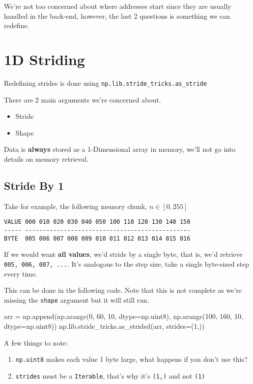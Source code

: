 \documentclass[oneside, 12pt]{report}
\begin{document}
We're not too concerned about where addresses start since they are usually handled in the back-end, however, the last 2 questions is something we can redefine.

\section{1D Striding}

Redefining strides is done using \verb+np.lib.stride_tricks.as_stride+

There are 2 main arguments we're concerned about.

\begin{itemize}
\item{Stride}
\item{Shape}
\end{itemize}

Data is \textbf{always} stored as a 1-Dimensional array in memory, we'll not go into details on memory retrieval.

\subsection{Stride By 1}

Take for example, the following memory chunk, $n \in [0, 255]$

\begin{verbatim}
VALUE 000 010 020 030 040 050 100 110 120 130 140 150
----- ----------------------------------------------- 
BYTE  005 006 007 008 009 010 011 012 013 014 015 016
\end{verbatim}

If we would want \textbf{all values}, we'd stride by a single byte, that is, we'd retrieve \verb+005, 006, 007, ...+. It's analogous to the step size, take a single byte-sized step every time.

This can be done in the following code. Note that this is not complete as we're missing the \verb+shape+ argument but it will still run.

\begin{python}
arr = np.append(np.arange(0, 60, 10, dtype=np.uint8),
                np.arange(100, 160, 10, dtype=np.uint8))
np.lib.stride_tricks.as_strided(arr, strides=(1,))
\end{python}

A few things to note:
\begin{enumerate}
\item{\verb+np.uint8+ makes each value 1 byte large, what happens if you don't use this?}
\item{\verb+strides+ must be a \verb+Iterable+, that's why it's \verb+(1,)+ and not \verb+(1)+}
\end{enumerate}
\end{document}

